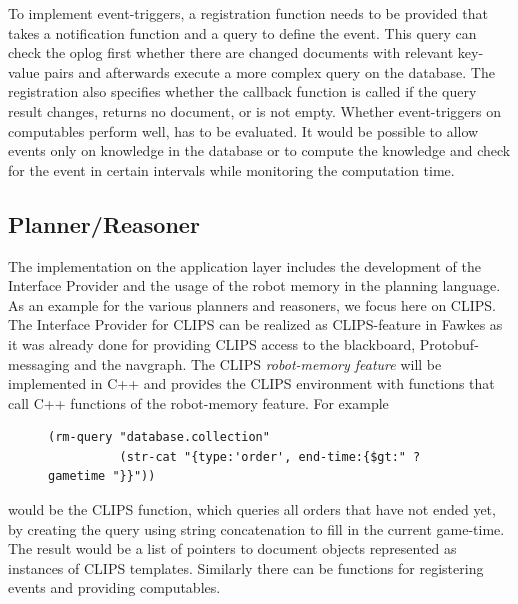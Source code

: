 To implement event-triggers, a registration function needs to be
provided that takes a notification function and a query to define the
event. This query can check the oplog first whether there are changed
documents with relevant key-value pairs and afterwards execute a more
complex query on the database. The registration also specifies whether
the callback function is called if the query result changes, returns
no document, or is not empty. Whether event-triggers on computables
perform well, has to be evaluated. It would be possible to allow
events only on knowledge in the database or to compute the knowledge
and check for the event in certain intervals while monitoring the
computation time.


\subsection{Planner/Reasoner}
\label{sec:impl-planner}
The implementation on the application layer includes the development
of the Interface Provider and the usage of the robot memory in the
planning language. As an example for the various planners and
reasoners, we focus here on CLIPS. The Interface Provider for CLIPS
can be realized as CLIPS-feature in Fawkes as it was already done for
providing CLIPS access to the blackboard, Protobuf-messaging and the
navgraph. The CLIPS \emph{robot-memory feature} will be implemented in C++
and provides the CLIPS environment with functions that call C++
functions of the robot-memory feature. For example 
\begin{figure}
  \begin{lstlisting}[showlines,style=ReallySmallCLIPS, caption={CLIPS function to execute a query},
  label=lst:clips-rm,
  emph={skill, args, state, target, res},
  emphstyle=\bfseries\color{green!80!black},
  emph={[2]\?skill, \$\?args, wait-for-lock, \?target, use,
  WAIT-FOR-LOCK, SKILL-EXECUTION, running},
  emphstyle={[2]\bfseries\color{blue!80!black}},
  morekeywords={retract, assert, modify, skill-call, skill-to-execute,
    wait-for-lock}]
(rm-query "database.collection"
          (str-cat "{type:'order', end-time:{$gt:" ?gametime "}}"))
\end{lstlisting} %
\end{figure}
would be the CLIPS function, which queries all orders that have not
ended yet, by creating the query using string concatenation to fill in
the current game-time. The result would be a list of pointers to document
objects represented as instances of CLIPS templates. Similarly there
can be functions for registering events and providing computables.

